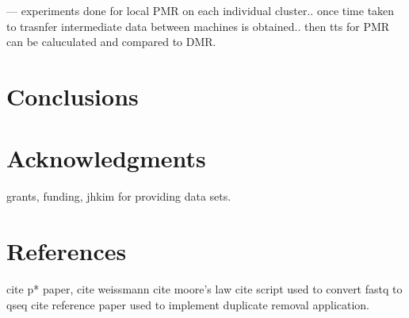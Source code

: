 \documentclass{acm_proc_article-sp}
\begin{document}
--- experiments done for local PMR on each individual cluster.. once time taken to trasnfer intermediate data between machines is obtained.. then tts for PMR can be caluculated and compared to DMR.



\section{Conclusions}



\section{Acknowledgments}
grants, funding, jhkim for providing data sets.

%

%
%

\section{References}
cite p* paper,
cite weissmann
cite moore's law
cite script used to convert fastq to qseq
cite reference paper used to implement duplicate removal application.
\end{document}
